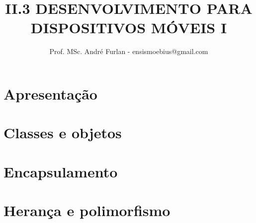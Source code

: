 

\title{II.3 DESENVOLVIMENTO PARA DISPOSITIVOS MÓVEIS I}


\author{Prof. MSc. André Furlan - ensismoebius@gmail.com}

\date{\the\year}

\newcommand{\apontar}[2]{
	\underset{\underset{#1}{\uparrow}}{\mathbf{#2}}
}


	
	\frame{\titlepage}
	
	\section{Apresentação}
		
		
	\section{Classes e objetos}
		
		
	\section{Encapsulamento}
		
		
	\section{Herança e polimorfismo}
		
		
	
